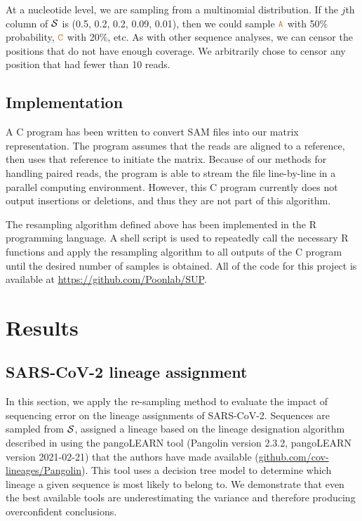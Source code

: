 \documentclass[12pt]{article}
\begin{document}
At a nucleotide level, we are sampling from a multinomial distribution.
If the $j$th column of $\mathcal{S}$ is (0.5, 0.2, 0.2, 0.09, 0.01), then we could sample $\texttt{\textcolor{brown}{A}}$ with 50\% probability, $\texttt{\textcolor{brown}{C}}$ with 20\%, etc.
As with other sequence analyses, we can censor the positions that do not have enough coverage.
We arbitrarily chose to censor any position that had fewer than 10 reads.

\subsection{Implementation}

A C program has been written to convert SAM files into our matrix representation.
The program assumes that the reads are aligned to a reference, then uses that reference to initiate the matrix.
Because of our methods for handling paired reads, the program is able to stream the file line-by-line in a parallel computing environment.
However, this C program currently does not output insertions or deletions, and thus they are not part of this algorithm.

The resampling algorithm defined above has been implemented in the R programming language.
A shell script is used to repeatedly call the necessary R functions and apply the resampling algorithm to all outputs of the C program until the desired number of samples is obtained.
All of the code for this project is available at \url{https://github.com/Poonlab/SUP}.

\section{Results}

\subsection{SARS-CoV-2 lineage assignment}

In this section, we apply the re-sampling method to evaluate the impact of sequencing error on the lineage assignments of SARS-CoV-2.
Sequences are sampled from $\mathcal{S}$, assigned a lineage based on the lineage designation algorithm described in \cite{rambautDynamicNomenclatureProposal2020} using the pangoLEARN tool (Pangolin version 2.3.2, pangoLEARN version 2021-02-21) that the authors have made available (\url{github.com/cov-lineages/Pangolin}).
This tool uses a decision tree model to determine which lineage a given sequence is most likely to belong to.
We demonstrate that even the best available tools are underestimating the variance and therefore producing overconfident conclusions.
\end{document}
